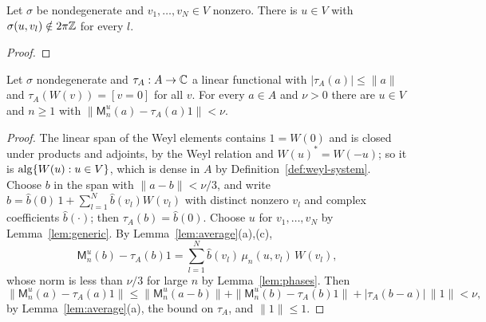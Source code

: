 \noindent{}

\begin{lemma}\label{lem:generic}
Let $\sigma$ be  nondegenerate  and $v_1,\dots,v_N\in V$ nonzero. There is $u\in V$ with
$\sigma(u,v_l)\notin2\pi\mathbb Z$ for every $l$.
\end{lemma}
\begin{proof}
\end{proof}

\noindent{}

\begin{proposition}[Approximation]\label{prop:approx}
Let  $\sigma$ nondegenerate\revk{,} and $\tau_A:A\to\mathbb C$ a linear functional with
$|\tau_A(a)|\leq\|a\|$ and $\tau_A(W(v))=[v=0]$ for all $v$. For every $a\in A$ and
$\nu>0$ there are $u\in V$ and $n\geq1$ with $\|\mathsf M^u_n(a)-\tau_A(a)1\|<\nu$.
\end{proposition}
\begin{proof}
The linear span of the Weyl elements contains $1=W(0)$ and is closed under products and
adjoints, by the Weyl relation and $W(u)^*=W(-u)$; so it is $\operatorname{alg}\{W(u):u\in V\}$, which is
dense in $A$ by Definition~\ref{def:weyl-system}. Choose $b$ in the span with $\|a-b\|<\nu/3$,
and write $b=\hat b(0)\,1+\sum_{l=1}^N\hat b(v_l)W(v_l)$ with distinct nonzero $v_l$ and complex
coefficients $\hat b(\cdot)$; then $\tau_A(b)=\hat b(0)$. Choose $u$ for $v_1,\dots,v_N$ by Lemma~\ref{lem:generic}. By
Lemma~\ref{lem:average}(a),(c),
\[
\mathsf M^u_n(b)-\tau_A(b)1=\sum_{l=1}^N\hat b(v_l)\,\mu_n(u,v_l)\,W(v_l),
\]
whose norm is 
less than $\nu/3$ for large $n$ by Lemma~\ref{lem:phases}. Then
\[
\|\mathsf M^u_n(a)-\tau_A(a)1\|\leq\|\mathsf M^u_n(a-b)\|+\|\mathsf M^u_n(b)-\tau_A(b)1\|
+|\tau_A(b-a)|\,\|1\|<\nu,
\]
by Lemma~\ref{lem:average}(a), the bound on $\tau_A$, and $\|1\|\leq1$.
\end{proof}

